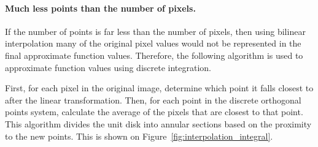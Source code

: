 \paragraph{Much less points than the number of pixels.}
If the number of points is far less than the number of pixels, then using bilinear interpolation many of the original pixel values would not be represented in the final approximate function values. Therefore, the following algorithm is used to approximate function values using discrete integration.

First, for each pixel in the original image, determine which point it falls closest to after the linear transformation. Then, for each point in the discrete orthogonal points system, calculate the average of the pixels that are closest to that point. This algorithm divides the unit disk into annular sections based on the proximity to the new points. This is shown on Figure~\ref{fig:interpolation_integral}.

